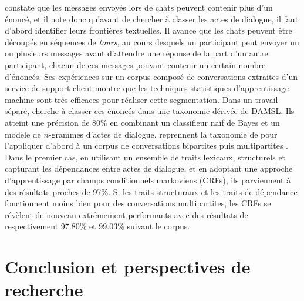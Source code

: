 \documentclass[10pt,a4paper,twoside]{article}
\begin{document}
\citet{ivanovic2005automatic} constate que les messages envoyés lors de chats peuvent contenir plus d'un énoncé, et il note donc qu'avant de chercher à classer les actes de dialogue, il faut d'abord identifier leurs frontières textuelles. Il avance que les chats peuvent être découpés en séquences de \textit{tours}, au cours desquels un participant peut envoyer un ou plusieurs messages avant d'attendre une réponse de la part d'un autre participant, chacun de ces messages pouvant contenir un certain nombre d'énoncés. Ses expériences sur un corpus composé de conversations extraites d'un service de support client montre que les techniques statistiques d'apprentissage machine sont très efficaces pour réaliser cette segmentation. Dans un travail séparé, \citet{ivanovic2005dialogue} cherche à classer ces énoncés dans une taxonomie dérivée de DAMSL. Ils atteint une précision de 80\% en combinant un classifieur naïf de Bayes et un modèle de $n$-grammes d'actes de dialogue. \citeauthor{kim2012classifying} reprennent la taxonomie de \citeauthor{ivanovic2005dialogue} pour l'appliquer d'abord à un corpus de conversations bipartites \cite{kim2010classifying} puis multipartites \cite{kim2012classifying}. Dans le premier cas, en utilisant un ensemble de traits lexicaux, structurels et capturant les dépendances entre actes de dialogue, et en adoptant une approche d'apprentissage par champs conditionnels markoviens (CRFs), ils parviennent à des résultats proches de 97\%. Si les traits structuraux et les traits de dépendance fonctionnent moins bien pour des conversations multipartites, les CRFs se révèlent de nouveau extrêmement performants avec des résultats de respectivement 97.80\% et 99.03\% suivant le corpus.

\section{Conclusion et perspectives de recherche}
\label{sec:conclusion_and_research_perspectives}
\end{document}

